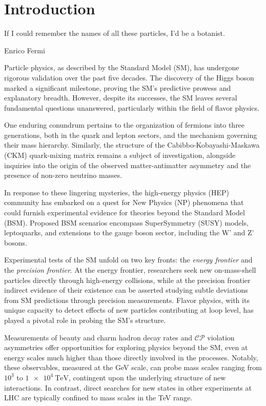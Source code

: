 
\chapter{Introduction}
\label{chp:intro}
\epigraph{If I could remember the names of all these particles, I'd be a botanist.}{Enrico Fermi}

Particle physics, as described by the Standard Model (SM), has undergone rigorous validation over the past five decades. The discovery of the Higgs boson marked a significant milestone, proving the SM's predictive prowess and explanatory breadth. However, despite its successes, the SM leaves several fundamental questions unanswered, particularly within the field of flavor physics.

One enduring conundrum pertains to the organization of fermions into three generations, both in the quark and lepton sectors, and the mechanism governing their mass hierarchy. Similarly, the structure of the Cabibbo-Kobayashi-Maskawa (CKM) quark-mixing matrix remains a subject of investigation, alongside inquiries into the origin of the observed matter-antimatter asymmetry and the presence of non-zero neutrino masses.

In response to these lingering mysteries, the high-energy physics (HEP) community has embarked on a quest for New Physics (NP) phenomena that could furnish experimental evidence for theories beyond the Standard Model (BSM). Proposed BSM scenarios encompass SuperSymmetry (SUSY) models, leptoquarks, and extensions to the gauge boson sector, including the W’ and Z’ bosons.

Experimental tests of the SM unfold on two key fronts: the \textit{energy frontier} and the \textit{precision frontier}. At the energy frontier, researchers seek new on-mass-shell particles directly through high-energy collisions, while at the precision frontier indirect evidence of their existence can be asserted studying subtle deviations from SM predictions through precision measurements. Flavor physics, with its unique capacity to detect effects of new particles contributing at loop level, has played a pivotal role in probing the SM's structure.

Measurements of beauty and charm hadron decay rates and $\mathcal{CP}$ violation asymmetries offer opportunities for exploring physics beyond the SM, even at energy scales much higher than those directly involved in the processes. Notably, these observables, measured at the GeV scale, can probe mass scales ranging from $10^3$ to $\SI{1e4}{\tera\eV}$, contingent upon the underlying structure of new interactions. In contrast, direct searches for new states in other experiments at LHC are typically confined to mass scales in the TeV range.

